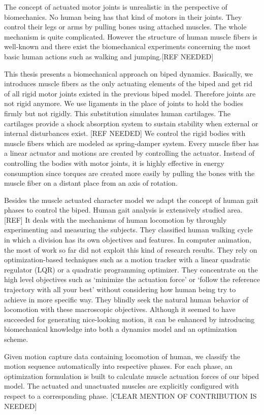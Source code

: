 \documentclass[a4paper,10pt]{article}
\begin{document}
The concept of actuated motor joints is unrealistic in the perspective of
biomechanics. No human being has that kind of motors in their joints.
They control their legs or arms by pulling bones using attached
muscles. The whole mechanism is quite complicated.
However the structure of human muscle fibers is well-known and there exist
the biomechanical experiments concerning the most basic human actions
such as walking and jumping.[REF NEEDED]

This thesis presents a biomechanical approach on biped dynamics. Basically,
we introduces muscle fibers as the only actuating elements
of the biped and get rid of all rigid motor joints existed in the previous biped
model. Therefore joints are not rigid anymore. We use ligaments in the place of joints
to hold the bodies firmly but not rigidly. This substitution
simulates human cartilages. The cartilages provide a shock absorption
system to sustain stability when external or internal disturbances exist. [REF NEEDED]
We control the rigid bodies with muscle fibers which are modeled as
spring-damper system. Every muscle fiber has a linear actuator and
motions are created by controlling the actuator. Instead of controlling
the bodies with motor joints, it is highly effective in energy consumption
since torques are created more easily by pulling the bones with the muscle
fiber on a distant place from an axis of rotation.

Besides the muscle actuated character model we adapt the concept of
human gait phases to control the biped. Human gait analysis is extensively
studied area.[REF] It deals with the mechanisms of human locomotion
by throughly experimenting and measuring
the subjects. They classified human walking cycle in which a division
has its own objectives and features.
In computer animation, the most of work so far did not
exploit this kind of research results. They rely on optimization-based
techniques such as a motion tracker with a linear quadratic regulator (LQR)
or a quadratic programming optimizer. They concentrate on the high level
objectives such as `minimize the actuation force' or `follow the reference
trajectory with all your best' without considering how human being try
to achieve in more specific way.  They blindly seek the natural human
behavior of locomotion with these macroscopic objectives.
Although it seemed to have succeeded for generating nice-looking motion,
it can be enhanced by introducing biomechanical knowledge into both
a dynamics model and an optimization scheme.

Given motion capture data containing locomotion of human, we classify the motion
sequence automatically into respective phases. For each phase,
an optimization formulation is built to calculate muscle actuation forces
of our biped model. The actuated and unactuated muscles are explicitly configured
with respect to a corresponding phase.
[CLEAR MENTION OF CONTRIBUTION IS NEEDED]
\end{document}
